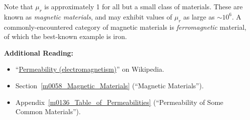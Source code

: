 Note that $\mu_r$ is approximately 1 for all but a small class of materials.  These are known as {\it magnetic materials}, and may exhibit values of $\mu_r$ as large as $\sim 10^6$.  
A commonly-encountered category of magnetic materials is \emph{ferromagnetic} material, of which the best-known example is iron.  


{\bf Additional Reading:}
\begin{itemize}
\item ``\href{https://en.wikipedia.org/wiki/Permeability_(electromagnetism)}{Permeability (electromagnetism)}'' on Wikipedia.
\item Section~\ref{m0058_Magnetic_Materials} (``Magnetic Materials'').
\item Appendix~\ref{m0136_Table_of_Permeabilities} (``Permeability of Some Common Materials'').
\end{itemize}

